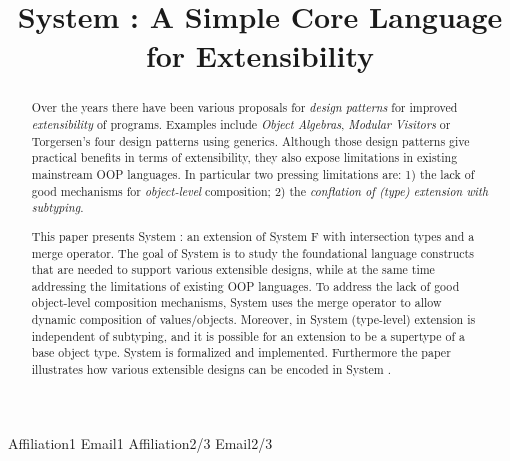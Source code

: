 \documentclass[times,10pt]{sigplanconf}
\begin{document}
\setlength{\pdfpageheight}{\paperheight}
\setlength{\pdfpagewidth}{\paperwidth}


\preprintfooter{\name}                        %

\title{System \name: A Simple Core Language for Extensibility}

           {Affiliation1}
           {Email1}
           {Affiliation2/3}
           {Email2/3}

\maketitle

\begin{abstract}
  
  Over the years there have been various proposals for \emph{design
    patterns} for improved \emph{extensibility} of programs.
  Examples include \emph{Object Algebras}, \emph{Modular Visitors} or
  Torgersen's four design patterns using generics.
  Although those design patterns give practical
  benefits in terms of extensibility, they also expose limitations in
  existing mainstream OOP languages. In particular two pressing
  limitations are: 1) the lack of good mechanisms for
  \emph{object-level} composition; 2) the \emph{conflation of 
    (type) extension with subtyping}.

  This paper presents System \name: an extension of System F with
  intersection types and a merge operator.  The goal of
  System \name is to study the foundational language constructs that
  are needed to support various extensible designs, while at the same
  time addressing the limitations of existing OOP languages. To
  address the lack of good object-level composition mechanisms, System
  \name uses the merge operator to allow dynamic composition of
  values/objects. Moreover, in System \name (type-level) extension is
  independent of subtyping, and it is possible for an extension to be
  a supertype of a base object type.  System \name is formalized and 
  implemented. Furthermore the paper illustrates how various extensible designs   
  can be encoded in System \name.

\end{abstract}
\end{document}
